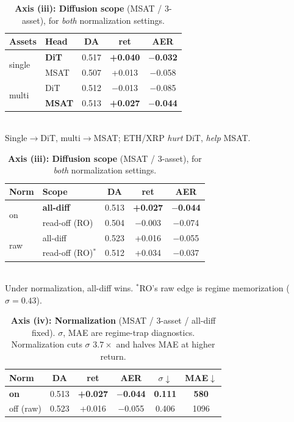 \documentclass[10pt]{article}
\begin{document}
\begin{table}[htbp]
\centering
\begin{minipage}[t]{0.49\textwidth}
\centering\footnotesize
\caption{\textbf{Axes (i)+(ii): Assets $\times$ head} (norm on). Best head flips with asset
count; multi-asset only helps MSAT.}
\label{tab:head}
\begin{tabular}{llccc}
\toprule
Assets & Head & DA & ret & AER \\ \midrule
\multirow{2}{*}{single}
 & \textbf{DiT}  & 0.517 & \textbf{+0.040} & \textbf{$-$0.032} \\
 & MSAT          & 0.507 & +0.013 & $-$0.058 \\ \midrule
\multirow{2}{*}{multi}
 & DiT           & 0.512 & $-$0.013 & $-$0.085 \\
 & \textbf{MSAT} & 0.513 & \textbf{+0.027} & \textbf{$-$0.044} \\
\bottomrule
\end{tabular}\\[2pt]
{\footnotesize Single$\to$DiT, multi$\to$MSAT; ETH/XRP \emph{hurt} DiT, \emph{help} MSAT.}
\end{minipage}\hfill
\begin{minipage}[t]{0.49\textwidth}
\centering\footnotesize
\caption{\textbf{Axis (iii): Diffusion scope} (MSAT / 3-asset), for \emph{both} normalization
settings.}
\label{tab:scope}
\begin{tabular}{llccc}
\toprule
Norm & Scope & DA & ret & AER \\ \midrule
\multirow{2}{*}{on}
 & \textbf{all-diff} & 0.513 & \textbf{+0.027} & \textbf{$-$0.044} \\
 & read-off (RO)     & 0.504 & $-$0.003 & $-$0.074 \\ \midrule
\multirow{2}{*}{raw}
 & all-diff          & 0.523 & +0.016 & $-$0.055 \\
 & read-off (RO)$^\ast$ & 0.512 & +0.034 & $-$0.037 \\
\bottomrule
\end{tabular}\\[2pt]
{\footnotesize Under normalization, all-diff wins. $^\ast$RO's raw edge is regime
memorization ($\sigma{=}0.43$).}
\end{minipage}
\end{table}

\begin{table}[htbp]
\centering\small
\caption{\textbf{Axis (iv): Normalization} (MSAT / 3-asset / all-diff fixed). $\sigma$, MAE are
regime-trap diagnostics. Normalization cuts $\sigma$ $3.7\times$ and halves MAE at higher return.}
\label{tab:norm}
\begin{tabular}{lccccc}
\toprule
Norm & DA & ret & AER & $\sigma\!\downarrow$ & MAE$\downarrow$ \\ \midrule
\textbf{on}  & 0.513 & \textbf{+0.027} & \textbf{$-$0.044} & \textbf{0.111} & \textbf{580} \\
off (raw)    & 0.523 & +0.016 & $-$0.055 & 0.406 & 1096 \\
\bottomrule
\end{tabular}
\end{table}
\end{document}
